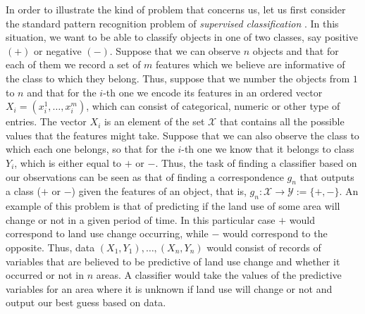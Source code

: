 \documentclass{uvamath}
\newcommand*{\calX}{\mathcal{X}}
\newcommand*{\calY}{\mathcal{Y}}
\theoremstyle{remark}
\theoremstyle{definition}
\theoremstyle{definition}
\theoremstyle{definition}
\theoremstyle{definition}
\theoremstyle{definition}
\begin{document}
In order to illustrate the kind of problem that concerns us, let us
first consider the standard pattern recognition problem of
\textit{supervised classification} \citep{gyorfi_probabilistic_1996}.
In this situation, we want to be able to classify objects in one of
two classes, say positive $(+)$ or negative $(-)$. Suppose that we can
observe $n$ objects and that for each of them we record a set of $m$
features which we believe are informative of the class to which they
belong.  Thus, suppose that we number the objects from $1$ to $n$ and
that for the $i$-th one we encode its features in an ordered vector
$X_i = (x_i^1,\dots,x_i^m)$, which can consist of categorical, numeric
or other type of entries. The vector $X_i$ is an element of the set
$\calX$ that contains all the possible values that the features might
take. Suppose that we can also observe the class to which each one
belongs, so that for the $i$-th one we know that it belongs to class
$Y_i$, which is either equal to $+$ or $-$.  Thus, the task of finding
a classifier based on our observations can be seen as that of finding
a correspondence $g_n$ that outputs a class ($+$ or $-$) given the
features of an object, that is, $g_n:\calX\to\calY :=\{+,-\}$. An
example of this problem is that of predicting if the land use of some
area will change or not in a given period of time. In this particular
case $+$ would correspond to land use change occurring, while $-$
would correspond to the opposite. Thus, data
$(X_1,Y_1),\dots, (X_n,Y_n)$ would consist of records of variables
that are believed to be predictive of land use change and whether it
occurred or not in $n$ areas. A classifier would take the values of
the predictive variables for an area where it is unknown if land use
will change or not and output our best guess based on data.
\end{document}
